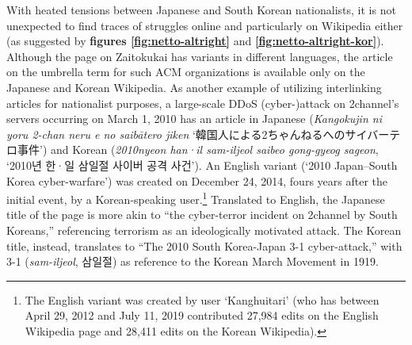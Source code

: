 \documentclass[10pt,british,A4paper,oneside]{memoir}
\begin{document}
With heated tensions between Japanese and South Korean nationalists, it
is not unexpected to find traces of struggles online and particularly on Wikipedia
either (as suggested by \textbf{figures \ref{fig:netto-altright}} and
\textbf{\ref{fig:netto-altright-kor}}). Although the page on Zaitokukai
has variants in different languages, the article on the umbrella term
for such ACM organizations is available
only on the Japanese and Korean Wikipedia. As another example of utilizing
interlinking articles for nationalist purposes, a large-scale DDoS
(cyber-)attack on 2channel's servers occurring on March 1, 2010 has an
article in Japanese (\emph{Kangokujin ni yoru 2-chan neru e no saibātero
jiken} `韓国人による2ちゃんねるへのサイバーテロ事件') and Korean
(\emph{2010nyeon han·il sam-iljeol saibeo gong-gyeog sageon}, `2010년
한·일 삼일절 사이버 공격 사건'). An English variant (`2010 Japan--South
Korea cyber-warfare') was created on December 24, 2014, fours years after
the initial event, by a Korean-speaking user.\footnote{The English
  variant was created by user `Kanghuitari' (who has between April 29,
  2012 and July 11, 2019 contributed 27,984 edits on the English
  Wikipedia page and 28,411 edits on the Korean Wikipedia).} Translated
to English, the Japanese title of the page is more akin to ``the
cyber-terror incident on 2channel by South Koreans,'' referencing terrorism as an ideologically motivated attack. The Korean
title, instead, translates to ``The 2010 South Korea-Japan 3-1
cyber-attack,'' with 3-1 (\emph{sam-iljeol}, 삼일절) as reference to the Korean March  Movement in 1919.
\end{document}
